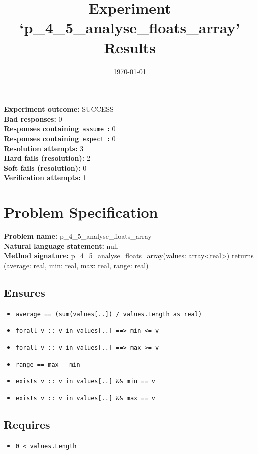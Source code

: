 \documentclass{article}
\begin{document}
\title{Experiment `p\_4\_5\_analyse\_floats\_array' Results}
\author{\today}
\date{}
\maketitle
\textbf{Experiment outcome: }SUCCESS
\\\textbf{Bad responses: }0
\\\textbf{Responses containing}~\texttt{assume}~\textbf{: }0
\\\textbf{Responses containing}~\texttt{expect}~\textbf{: }0
\\\textbf{Resolution attempts: }3
\\\textbf{Hard fails (resolution): }2
\\\textbf{Soft fails (resolution): }0
\\\textbf{Verification attempts: }1
\section*{Problem Specification}
\textbf{Problem name: }p\_4\_5\_analyse\_floats\_array
\\\textbf{Natural language statement: }null
\\\textbf{Method signature: }p\_4\_5\_analyse\_floats\_array(values: array<real>) returns (average: real, min: real, max: real, range: real)
\subsection*{Ensures}
\begin{itemize}
\item \texttt{average == (sum(values[..]) / values.Length as real)}
\item \texttt{forall v :: v in values[..] ==> min <= v}
\item \texttt{forall v :: v in values[..] ==> max >= v}
\item \texttt{range == max - min}
\item \texttt{exists v :: v in values[..] \&\& min == v}
\item \texttt{exists v :: v in values[..] \&\& max == v}
\end{itemize}
\subsection*{Requires}
\begin{itemize}
\item \texttt{0 < values.Length}
\end{itemize}
\end{document}
